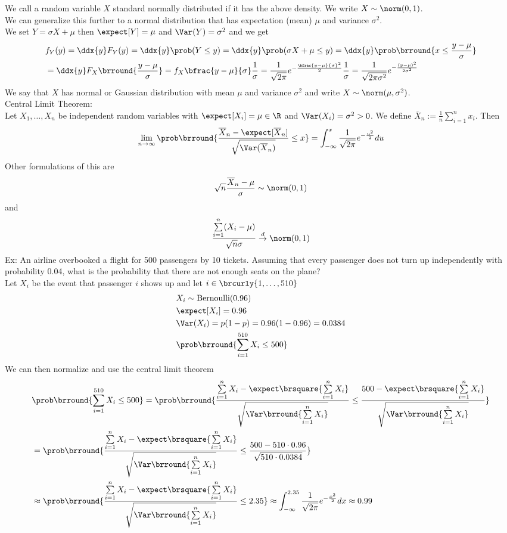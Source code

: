 We call a random variable $X$ standard normally distributed if it has the above density. We write $X\sim\norm(0,1)$.\\
We can generalize this further to a normal distribution that has expectation (mean) $\mu$ and variance $\sigma^2$.\\
We set $Y=\sigma X+\mu$ then $\expect[Y]=\mu$ and $\Var(Y)=\sigma^2$ and we get
\begin{align*}
    &f_Y(y)=\ddx{y}F_Y(y)=\ddx{y}\prob(Y\leq y)=\ddx{y}\prob(\sigma X+\mu\leq y)=\ddx{y}\prob\brround{x\leq\frac{y-\mu}{\sigma}}\\
    &=\ddx{y}F_X\brround{\frac{y-\mu}{\sigma}}=f_X\bfrac{y-\mu}{\sigma}\frac{1}{\sigma}=\frac{1}{\sqrt{2\pi}}e^{-\frac{\bfrac{y-\mu}{\sigma}^2}{2}}\frac{1}{\sigma}=\frac{1}{\sqrt{2\pi\sigma^2}}e^{-\frac{(y-\mu)^2}{2\sigma^2}}
\end{align*}
We say that $X$ has normal or Gaussian distribution with mean $\mu$ and variance $\sigma^2$ and write $X\sim\norm(\mu,\sigma^2)$.\\
Central Limit Theorem:\\
Let $X_1,\ldots, X_n$ be independent random variables with $\expect[X_i]=\mu\in\R$ and $\Var(X_i)=\sigma^2>0$. We define $\overline{X}_n:=\frac{1}{n}\sum\limits_{i=1}^n x_i$. Then
\[\lim_{n\to\infty}\prob\brround{\frac{\overline{X}_n-\expect[\overline{X}_n]}{\sqrt{\Var(\overline{X}_n)}}\leq x}=\int_{-\infty}^x\frac{1}{\sqrt{2\pi}}e^{-\frac{u^2}{2}}du\]
Other formulations of this are
\[\sqrt{n}\frac{\overline{X}_n-\mu}{\sigma}\sim\norm(0,1)\]
and
\[\frac{\sum\limits_{i=1}^n(X_i-\mu)}{\sqrt{n}\sigma}\overset{d}{\to}\norm(0,1)\]
Ex: An airline overbooked a flight for 500 passengers by 10 tickets. Assuming that every passenger does not turn up independently with probability 0.04, what is the probability that there are not enough seats on the plane?\\
Let $X_i$ be the event that passenger $i$ shows up and let $i\in\brcurly{1,\ldots,510}$
\begin{align*}
    &X_i\sim\mathrm{Bernoulli}(0.96)\\
    &\expect[X_i]=0.96\\
    &\Var(X_i)=p(1-p)=0.96(1-0.96)=0.0384\\
    &\prob\brround{\sum_{i=1}^{510}X_i\leq 500}
\end{align*}
We can then normalize and use the central limit theorem
\begin{align*}
    &\prob\brround{\sum_{i=1}^{510}X_i\leq 500}=\prob\brround{\frac{\sum\limits_{i=1}^nX_i-\expect\brsquare{\sum\limits_{i=1}^n X_i}}{\sqrt{\Var\brround{\sum\limits_{i=1}^n X_i}}}\leq\frac{500-\expect\brsquare{\sum\limits_{i=1}^n X_i}}{\sqrt{\Var\brround{\sum\limits_{i=1}^n X_i}}}}\\
    &=\prob\brround{\frac{\sum\limits_{i=1}^nX_i-\expect\brsquare{\sum\limits_{i=1}^n X_i}}{\sqrt{\Var\brround{\sum\limits_{i=1}^n X_i}}}\leq\frac{500-510\cdot0.96}{\sqrt{510\cdot0.0384}}}\\
    &\approx\prob\brround{\frac{\sum\limits_{i=1}^nX_i-\expect\brsquare{\sum\limits_{i=1}^n X_i}}{\sqrt{\Var\brround{\sum\limits_{i=1}^n X_i}}}\leq 2.35}\approx\int_{-\infty}^{2.35}\frac{1}{\sqrt{2\pi}}e^{-\frac{x^2}{2}}dx\approx 0.99
\end{align*}
